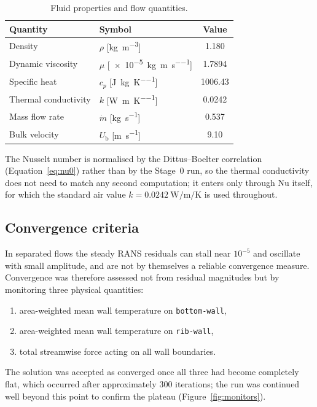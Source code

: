 \documentclass[11pt,a4paper]{article}
\newcommand{\Nuss}{\mathrm{Nu}}
\newcommand{\Ub}{U_{\mathrm{b}}}
\begin{document}
\begin{table}[htbp]
\centering
\caption{Fluid properties and flow quantities.}
\label{tab:fluid}
\begin{tabular}{llS}
\toprule
Quantity & Symbol & {Value} \\
\midrule
Density                & $\rho$ [\si{\kilogram\per\cubic\meter}]          & 1.180 \\
Dynamic viscosity      & $\mu$ [\SI{e-5}{\kilogram\per\meter\per\second}] & 1.7894 \\
Specific heat          & $c_{p}$ [\si{\joule\per\kilogram\per\kelvin}]    & 1006.43 \\
Thermal conductivity   & $k$ [\si{\watt\per\meter\per\kelvin}]            & 0.0242 \\
Mass flow rate         & $\dot{m}$ [\si{\kilogram\per\second}]            & 0.537 \\
Bulk velocity          & $\Ub$ [\si{\meter\per\second}]                   & 9.10 \\
\bottomrule
\end{tabular}
\end{table}

The Nusselt number is normalised by the Dittus--Boelter correlation
(Equation~\eqref{eq:nu0}) rather than by the Stage~0 run, so the thermal
conductivity does not need to match any second computation; it enters only
through $\Nuss$ itself, for which the standard air value
$k = \SI{0.0242}{\watt\per\meter\per\kelvin}$ is used throughout.

\subsection{Convergence criteria}
\label{sec:conv}

In separated flows the steady RANS residuals can stall near $10^{-5}$ and
oscillate with small amplitude, and are not by themselves a reliable
convergence measure. Convergence was therefore assessed not from residual
magnitudes but by monitoring three physical quantities:
\begin{enumerate}\itemsep0pt
  \item area-weighted mean wall temperature on \texttt{bottom-wall},
  \item area-weighted mean wall temperature on \texttt{rib-wall},
  \item total streamwise force acting on all wall boundaries.
\end{enumerate}
The solution was accepted as converged once all three had become completely
flat, which occurred after approximately 300 iterations; the run was
continued well beyond this point to confirm the plateau
(Figure~\ref{fig:monitors}).
\end{document}
